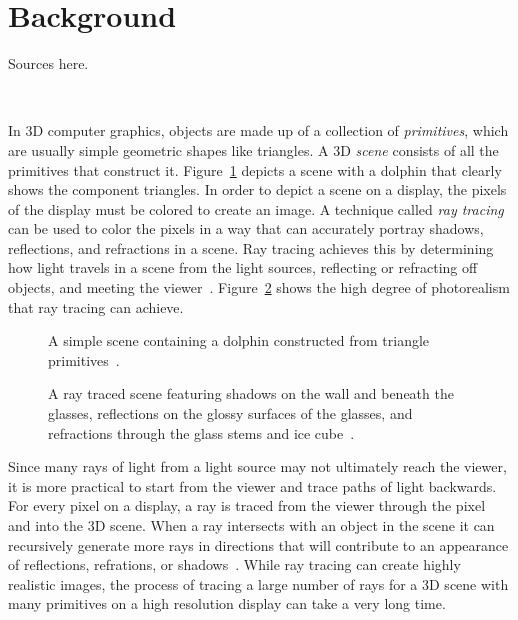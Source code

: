 \documentclass{sig-alternate}
\begin{document}


\section{Background}
\label{sec:background}

Sources here.

~\cite{Garanzha:2011}
~\cite{Karras:2012}
~\cite{Karras:2013}
~\cite{Whitted:1980}
~\cite{wiki:box}
~\cite{wiki:mesh}
~\cite{wiki:bvh}
~\cite{wiki:rayTracing}
~\cite{wiki:morton}

In 3D computer graphics, objects are made up of a collection of \emph{primitives}, which are usually simple geometric shapes like triangles. A 3D \emph{scene} consists of all the primitives that construct it. Figure~\ref{fig:dolphin} depicts a scene with a dolphin that clearly shows the component triangles. In order to depict a scene on a display, the pixels of the display must be colored to create an image. A technique called \emph{ray tracing} can be used to color the pixels in a way that can accurately portray shadows, reflections, and refractions in a scene. Ray tracing achieves this by determining how light travels in a scene from the light sources, reflecting or refracting off objects, and meeting the viewer~\cite{Whitted:1980}. Figure~\ref{fig:glasses} shows the high degree of photorealism that ray tracing can achieve.

\begin{figure}
\centering
{}
\caption{A simple scene containing a dolphin constructed from triangle primitives~\cite{wiki:mesh}.}
\label{fig:dolphin}
\end{figure}

\begin{figure}
\centering
{}
\caption{A ray traced scene featuring shadows on the wall and beneath the glasses, reflections on the glossy surfaces of the glasses, and refractions through the glass stems and ice cube~\cite{wiki:rayTracing}.}
\label{fig:glasses}
\end{figure}

Since many rays of light from a light source may not ultimately reach the viewer, it is more practical to start from the viewer and trace paths of light backwards. For every pixel on a display, a ray is traced from the viewer through the pixel and into the 3D scene. When a ray intersects with an object in the scene it can recursively generate more rays in directions that will contribute to an appearance of reflections, refrations, or shadows~\cite{Whitted:1980}. While ray tracing can create highly realistic images, the process of tracing a large number of rays for a 3D scene with many primitives on a high resolution display can take a very long time.
\end{document}
